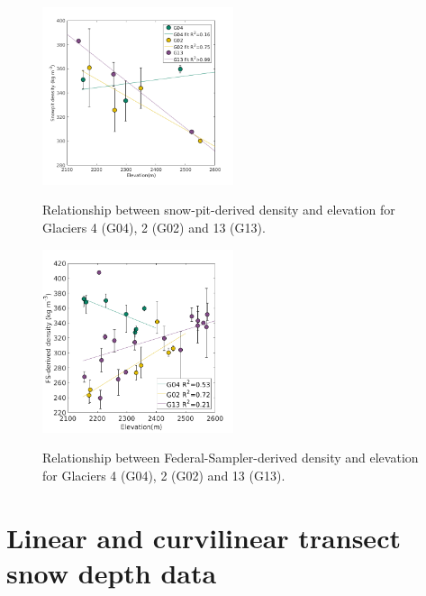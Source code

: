 \documentclass{sfuthesis}
\begin{document}
{\begin{figure}[H]
	\centering
	\includegraphics[width = 0.5\textwidth]{ElevationVsSnowpit_all.png}\\
	\caption[Relationship between snow-pit-derived density and elevation for study glaciers]{Relationship between snow-pit-derived density and elevation for Glaciers 4 (G04), 2 (G02) and 13 (G13).}
	\label{fig:elev_snowpit}
\end{figure}


\begin{figure}[H]
	\centering
	\includegraphics[width = 0.5\textwidth]{ElevationVsSWEtube_all.png}\\
	\caption[Relationship between Federal-Sampler-derived density and elevation for study glaciers]{Relationship between Federal-Sampler-derived density and elevation for Glaciers 4 (G04), 2 (G02) and 13 (G13).}
	\label{fig:elev_tube}
\end{figure}


\section{Linear and curvilinear transect snow depth data}

}
\end{document}
